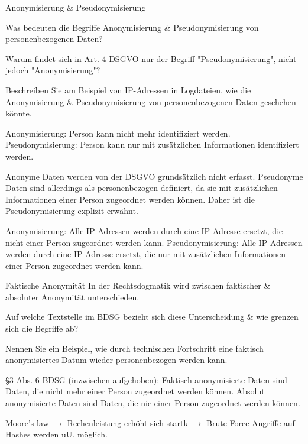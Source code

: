 \documentclass{exercisesheet}
\begin{document}
\begin{exercises}{Anonymisierung \& Pseudonymisierung}
\item Was bedeuten die Begriffe Anonymisierung \& Pseudonymisierung von personenbezogenen Daten?
\item Warum findet sich in Art. 4 DSGVO nur der Begriff "Pseudonymisierung", nicht jedoch "Anonymisierung"?
\item Beschreiben Sie am Beispiel von IP-Adressen in Logdateien, wie die Anonymisierung \& Pseudonymisierung von personenbezogenen Daten geschehen könnte.
\end{exercises}

\begin{solutions}
  \item Anonymisierung: Person kann nicht mehr identifiziert werden. Pseudonymisierung: Person kann nur mit zusätzlichen Informationen identifiziert werden.
  \item Anonyme Daten werden von der DSGVO grundsätzlich nicht erfasst. Pseudonyme Daten sind allerdings als personenbezogen definiert, da sie mit zusätzlichen Informationen einer Person zugeordnet werden können. Daher ist die Pseudonymisierung explizit erwähnt.
  \item Anonymisierung: Alle IP-Adressen werden durch eine IP-Adresse ersetzt, die nicht einer Person zugeordnet werden kann. Pseudonymisierung: Alle IP-Adressen werden durch eine IP-Adresse ersetzt, die nur mit zusätzlichen Informationen einer Person zugeordnet werden kann.
\end{solutions}

\begin{eexercises}{Faktische Anonymität}{
    In der Rechtsdogmatik wird zwischen faktischer \& absoluter Anonymität unterschieden.
  }
  \item Auf welche Textstelle im BDSG bezieht sich diese Unterscheidung \& wie grenzen sich die Begriffe ab?
  \item Nennen Sie ein Beispiel, wie durch technischen Fortschritt eine faktisch anonymisiertes Datum wieder personenbezogen werden kann.
\end{eexercises}

\begin{solutions}
  \item §3 Abs. 6 BDSG (inzwischen aufgehoben): Faktisch anonymisierte Daten sind Daten, die nicht mehr einer Person zugeordnet werden können. Absolut anonymisierte Daten sind Daten, die nie einer Person zugeordnet werden können.
  \item Moore's law $\to$ Rechenleistung erhöht sich startk $\to$ Brute-Force-Angriffe auf Hashes werden uU. möglich.
\end{solutions}
\end{document}
